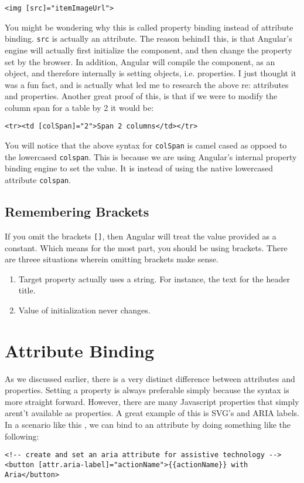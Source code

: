 \begin{lstlisting}
<img [src]="itemImageUrl">
\end{lstlisting}

You might be wondering why this is called property binding instead of 
attribute binding. \lstinline{src} is actually an attribute. The reason behind1
this, is that Angular's engine will actually first initialize the component, 
and then change the property set by the browser. In addition, Angular will 
compile the component, as an object, and therefore internally is setting 
objects, i.e. properties. I just thought it was a fun fact, and is actually 
what led me to research the above re: attributes and properties. Another great
proof of this, is that if we were to modify the column span for a table by 2
it would be: 
\begin{lstlisting}
<tr><td [colSpan]="2">Span 2 columns</td></tr>
\end{lstlisting}

You will notice that the above syntax for \lstinline{colSpan} is camel cased 
as oppoed to the lowercased \lstinline{colspan}. This is because we are using
Angular's internal property binding engine to set the value. It is instead of 
using the native lowercased attribute \lstinline{colspan}. 


\subsection{ Remembering Brackets }
If you omit the brackets \lstinline{[]}, then Angular will treat the value
provided as a constant. Which means for the most part, you should be using
brackets. There are threee situations wherein omitting brackets make sense. 
\begin{enumerate}
  \item Target property actually uses a string. For instance, the text for 
  the header title. 
  \item Value of initialization never changes.
\end{enumerate}

\section{ Attribute Binding }
As we discussed earlier, there is a very distinct difference between 
attributes and properties. Setting a property is always preferable 
simply because the syntax is more straight forward. However, there are many 
Javascript properties that simply arent't available as properties. A great
example of this is SVG's and ARIA labels. In a scenario like this , we can bind 
to an attribute by doing something like the following: 
\begin{lstlisting}
<!-- create and set an aria attribute for assistive technology -->
<button [attr.aria-label]="actionName">{{actionName}} with Aria</button>  
\end{lstlisting}

